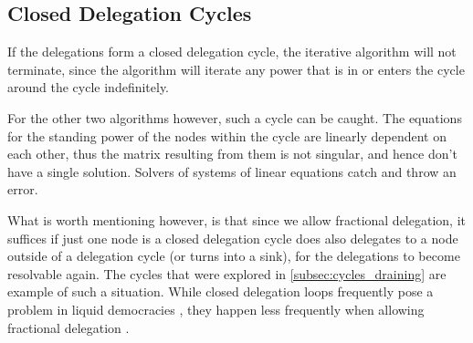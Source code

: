 \subsection{Closed Delegation Cycles}

If the delegations form a closed delegation cycle, the iterative algorithm will not terminate, since the algorithm will iterate any power that is in or enters the cycle around the cycle indefinitely. 

For the other two algorithms however, such a cycle can be caught. The equations for the standing power of the nodes within the cycle are linearly dependent on each other, thus the matrix resulting from them is not singular, and hence don't have a single solution. Solvers of systems of linear equations catch and throw an error.

What is worth mentioning however, is that since we allow fractional delegation, it suffices if just one node is a closed delegation cycle does also delegates to a node outside of a delegation cycle (or turns into a sink), for the delegations to become resolvable again. The cycles that were explored in \cref{subsec:cycles_draining} are example of such a situation. While closed delegation loops frequently pose a problem in liquid democracies , they happen less frequently when allowing fractional delegation .



